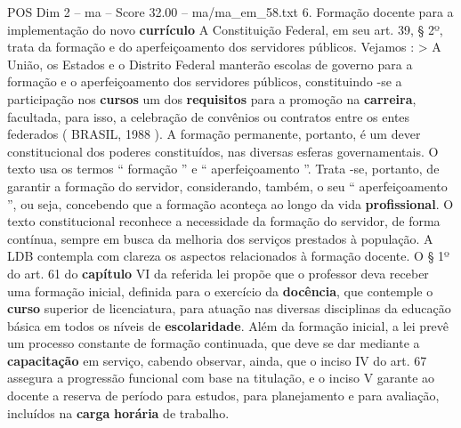 \begin{textsample}{POS Dim 2 – ma – Score 32.00 – ma/ma\_em\_58.txt}  \label{ex:f2_pos_052}
6.
Formação docente para a implementação do novo \textbf{currículo} A Constituição Federal, em seu art. 39, § 2º, trata da formação e do aperfeiçoamento dos servidores públicos.
Vejamos : > A União, os Estados e o Distrito Federal manterão escolas de governo para a formação e o aperfeiçoamento dos servidores públicos, constituindo -se a participação nos \textbf{cursos} um dos \textbf{requisitos} para a promoção na \textbf{carreira}, facultada, para isso, a celebração de convênios ou contratos entre os entes federados ( BRASIL, 1988 ).
A formação permanente, portanto, é um dever constitucional dos poderes constituídos, nas diversas esferas governamentais.
O texto usa os termos “ formação ” e “ aperfeiçoamento ”.
Trata -se, portanto, de garantir a formação do servidor, considerando, também, o seu “ aperfeiçoamento ”, ou seja, concebendo que a formação aconteça ao longo da vida \textbf{profissional}.
O texto constitucional reconhece a necessidade da formação do servidor, de forma contínua, sempre em busca da melhoria dos serviços prestados à população.
A LDB contempla com clareza os aspectos relacionados à formação docente.
O § 1º do art. 61 do \textbf{capítulo} VI da referida lei propõe que o professor deva receber uma formação inicial, definida para o exercício da \textbf{docência}, que contemple o \textbf{curso} superior de licenciatura, para atuação nas diversas disciplinas da educação básica em todos os níveis de \textbf{escolaridade}.
Além da formação inicial, a lei prevê um processo constante de formação continuada, que deve se dar mediante a \textbf{capacitação} em serviço, cabendo observar, ainda, que o inciso IV do art. 67 assegura a progressão funcional com base na titulação, e o inciso V garante ao docente a reserva de período para estudos, para planejamento e para avaliação, incluídos na \textbf{carga} \textbf{horária} de trabalho.

\end{textsample}
